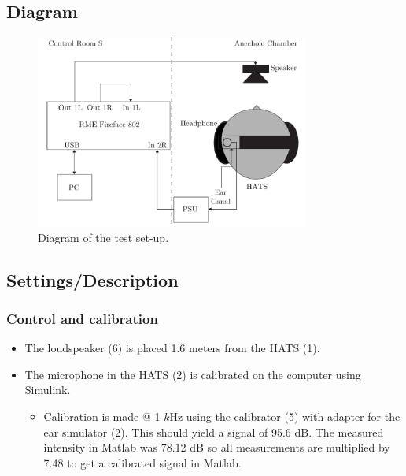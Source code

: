 \subsection{Diagram}
\begin{figure}[H]
	\centering
	\includegraphics[width=0.8\textwidth]{../Journal/Experiments/TestofConsumerHeadphones/OtherBrandsDiagram.pdf}
	\caption{Diagram of the test set-up.}
	\label{OtherBrandsDiagram}
\end{figure}


\subsection{Settings/Description}
\subsubsection{Control and calibration}
\begin{itemize}
	\item The  loudspeaker (6) is placed 1.6 meters from the HATS (1).
	\item The microphone in the HATS (2) is calibrated on the computer using Simulink.
	\begin{itemize} 
		\item Calibration is made @ 1 $k$Hz using the calibrator (5) with adapter for the ear simulator (2). This should yield a signal of 95.6 dB. The measured intensity in Matlab was 78.12 dB so all measurements are multiplied by 7.48 to get a calibrated signal in Matlab.
	\end{itemize}
\end{itemize}

